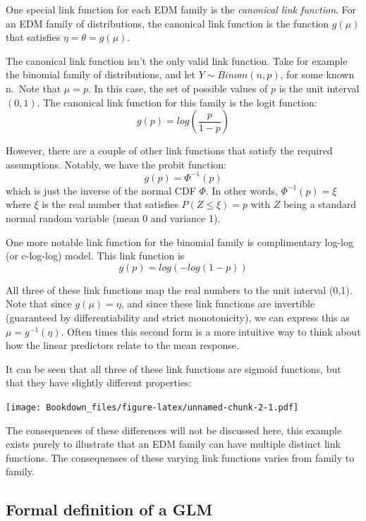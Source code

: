 \documentclass[
]{book}
\begin{document}
One special link function for each EDM family is the \emph{canonical link function}. For an EDM family of distributions, the canonical link function is the function \(g(\mu)\) that satisfies \(\eta=\theta=g(\mu)\).

The canonical link function isn't the only valid link function. Take for example the binomial family of distributions, and let \(Y\sim Binom(n,p)\), for some known n.~Note that \(\mu = p\). In this case, the set of possible values of \(p\) is the unit interval \((0,1)\). The canonical link function for this family is the logit function:
\[
g(p) = log\left(\frac{p}{1-p}\right)
\]

However, there are a couple of other link functions that satisfy the required assumptions. Notably, we have the probit function:
\[
g(p)=\Phi^{-1}(p)
\]
which is just the inverse of the normal CDF \(\Phi\). In other words, \(\Phi^{-1}(p) = \xi\) where \(\xi\) is the real number that satisfies \(P(Z\leq\xi)=p\) with \(Z\) being a standard normal random variable (mean 0 and variance 1).

One more notable link function for the binomial family is complimentary log-log (or c-log-log) model. This link function is
\[
g(p) = log(-log(1-p))
\]

All three of these link functions map the real numbers to the unit interval (0,1). Note that since \(g(\mu)=\eta\), and since these link functions are invertible (guaranteed by differentiability and strict monotonicity), we can express this as \(\mu = g^{-1}(\eta)\). Often times this second form is a more intuitive way to think about how the linear predictors relate to the mean response.

It can be seen that all three of these link functions are sigmoid functions, but that they have slightly different properties:

\texttt{[image: Bookdown\_files/figure-latex/unnamed-chunk-2-1.pdf]}

The consequences of these differences will not be discussed here, this example exists purely to illustrate that an EDM family can have multiple distinct link functions. The consequenses of these varying link functions varies from family to family.

\hypertarget{formal-definition-of-a-glm}{%
\subsection{Formal definition of a GLM}\label{formal-definition-of-a-glm}}
\end{document}
